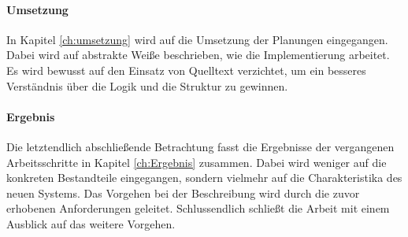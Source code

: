 \paragraph{Umsetzung} In Kapitel \ref{ch:umsetzung} wird auf die Umsetzung der Planungen eingegangen. Dabei wird auf abstrakte Weiße beschrieben, wie die Implementierung arbeitet. Es wird bewusst auf den Einsatz von Quelltext verzichtet, um ein besseres Verständnis über die Logik und die Struktur zu gewinnen. 

\paragraph{Ergebnis} Die letztendlich abschließende Betrachtung fasst die Ergebnisse der vergangenen Arbeitsschritte in Kapitel \ref{ch:Ergebnis} zusammen. Dabei wird weniger auf die konkreten Bestandteile eingegangen, sondern vielmehr auf die Charakteristika des neuen Systems. Das Vorgehen bei der Beschreibung wird durch die zuvor erhobenen Anforderungen geleitet. Schlussendlich schließt die Arbeit mit einem Ausblick auf das weitere Vorgehen. 

